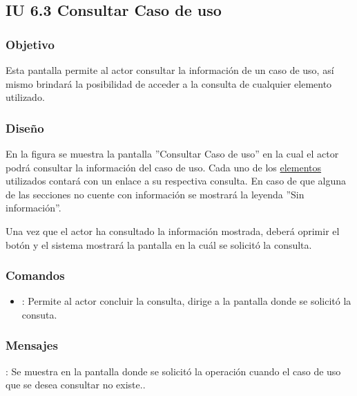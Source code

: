 \subsection{IU 6.3 Consultar Caso de uso}

\subsubsection{Objetivo}
	Esta pantalla permite al actor consultar la información de un caso de uso, así mismo brindará la posibilidad de acceder a la consulta de cualquier elemento utilizado.
\subsubsection{Diseño}
	En la figura  se muestra la pantalla ''Consultar Caso de uso'' en la cual el actor podrá consultar la información del caso de uso. Cada uno de los \hyperlink{tElemento}{elementos} utilizados contará con un enlace a su respectiva consulta. En caso de que alguna de las secciones no cuente con información se mostrará la leyenda ''Sin información''.

Una vez que el actor ha consultado la información mostrada, deberá oprimir el botón  y el sistema mostrará la pantalla en la cuál se solicitó la consulta.

\subsubsection{Comandos}
\begin{itemize}
	\item {}: Permite al actor concluir la consulta, dirige a la pantalla donde se solicitó la consuta.
\end{itemize}

\subsubsection{Mensajes}

\begin{Citemize}
	\item {}: Se muestra en la pantalla donde se solicitó la operación cuando el caso de uso que se desea consultar no existe..
\end{Citemize}
